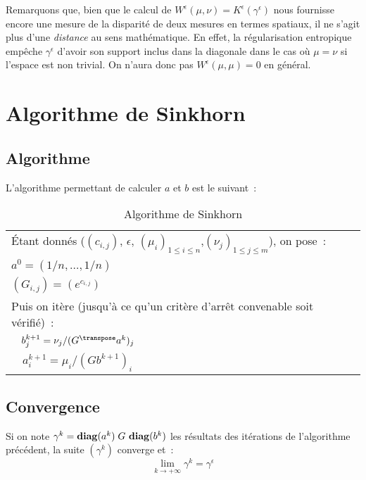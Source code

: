 Remarquons que, bien que le calcul de $W^\epsilon(\mu,\nu) = K^\epsilon(\gamma^\epsilon)$ nous fournisse encore une mesure de la disparité de deux mesures en termes spatiaux, il ne s'agit plus d'une \emph{distance} au sens mathématique. En effet, la régularisation entropique empêche $\gamma^\epsilon$ d'avoir son support inclus dans la diagonale dans le cas où $\mu = \nu$ si l'espace est non trivial. On n'aura donc pas $W^\epsilon (\mu,\mu) = 0$ en général.

\section{Algorithme de Sinkhorn}

\subsection{Algorithme}
L'algorithme permettant de calculer $a$ et $b$ est le suivant~:

\begin{table}[h!]
\centering
\caption*{Algorithme de Sinkhorn}
\label{algorithme}
\begin{tabular}{|l|}
\hline
\'Etant donnés ($(c_{i,j})$, $\epsilon$, $(\mu_i)_{1\le i \le n}$,$(\nu_j)_{1 \le j \le m}$), on pose~: \\
$a^0 = (1/n, \ldots, 1/n)$\\
$(G_{i,j}) = (e^{c_{i,j}})$\\
Puis on itère (jusqu'à ce qu'un critère d'arrêt convenable soit vérifié)~: \\
$\quad b^{k+1}_j = \nu_j / (G^\transpose a^k)_j$\\
$\quad a^{k+1}_i = \mu_i /(G b^{k+1})_i$ \\
\hline
\end{tabular}
\end{table}

\subsection{Convergence}
\begin{theoreme}
\label{th:sink_cv}
Si on note $\gamma^k = \operatorname{\mathbf{diag}}(a^k)\;G\,\operatorname{\mathbf{diag}}(b^k)$ les résultats des itérations de l'algorithme précédent, la suite $(\gamma^k)$ converge et~:
\[\lim_{k \rightarrow +\infty} \gamma^k = \gamma^\epsilon\]
\end{theoreme}

